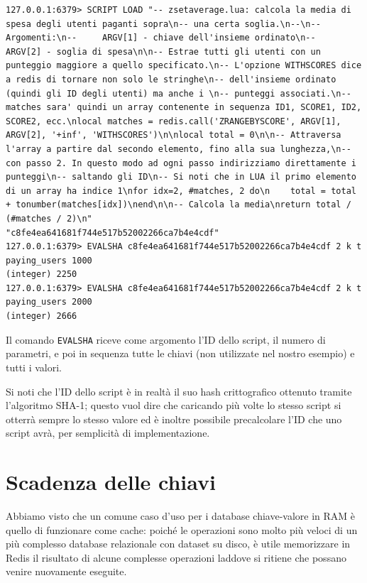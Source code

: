 \medskip
\begin{lstlisting}
127.0.0.1:6379> SCRIPT LOAD "-- zsetaverage.lua: calcola la media di spesa degli utenti paganti sopra\n-- una certa soglia.\n--\n-- Argomenti:\n--     ARGV[1] - chiave dell'insieme ordinato\n--     ARGV[2] - soglia di spesa\n\n-- Estrae tutti gli utenti con un punteggio maggiore a quello specificato.\n-- L'opzione WITHSCORES dice a redis di tornare non solo le stringhe\n-- dell'insieme ordinato (quindi gli ID degli utenti) ma anche i \n-- punteggi associati.\n-- matches sara' quindi un array contenente in sequenza ID1, SCORE1, ID2, SCORE2, ecc.\nlocal matches = redis.call('ZRANGEBYSCORE', ARGV[1], ARGV[2], '+inf', 'WITHSCORES')\n\nlocal total = 0\n\n-- Attraversa l'array a partire dal secondo elemento, fino alla sua lunghezza,\n-- con passo 2. In questo modo ad ogni passo indirizziamo direttamente i punteggi\n-- saltando gli ID\n-- Si noti che in LUA il primo elemento di un array ha indice 1\nfor idx=2, #matches, 2 do\n    total = total + tonumber(matches[idx])\nend\n\n-- Calcola la media\nreturn total / (#matches / 2)\n"
"c8fe4ea641681f744e517b52002266ca7b4e4cdf"
127.0.0.1:6379> EVALSHA c8fe4ea641681f744e517b52002266ca7b4e4cdf 2 k t paying_users 1000
(integer) 2250
127.0.0.1:6379> EVALSHA c8fe4ea641681f744e517b52002266ca7b4e4cdf 2 k t paying_users 2000
(integer) 2666
\end{lstlisting}

Il comando \verb|EVALSHA| riceve come argomento l'ID dello script, il numero di parametri, e poi
in sequenza tutte le chiavi (non utilizzate nel nostro esempio) e tutti i valori. 

Si noti che l'ID dello script è in realtà il suo hash crittografico ottenuto tramite l'algoritmo
SHA-1; questo vuol dire che caricando più volte lo stesso script si otterrà sempre lo stesso valore
ed è inoltre possibile precalcolare l'ID che uno script avrà, per semplicità di implementazione.

\section{Scadenza delle chiavi}

Abbiamo visto che un comune caso d'uso per i database chiave-valore in RAM è quello di funzionare
come cache: poiché le operazioni sono molto più veloci di un più complesso database relazionale con
dataset su disco, è utile memorizzare in Redis il risultato di alcune complesse operazioni laddove
si ritiene che possano venire nuovamente eseguite. 

